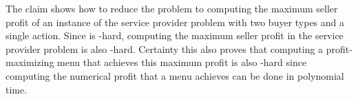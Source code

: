 The claim shows how to reduce the  problem to computing the maximum seller profit of an instance of the service provider problem with two buyer types and a single action. Since  is -hard, computing the maximum seller profit in the service provider problem is also -hard. Certainty this also proves that computing a profit-maximizing menu that achieves this maximum profit is also -hard since computing the numerical profit that a menu achieves can be done in polynomial time.






